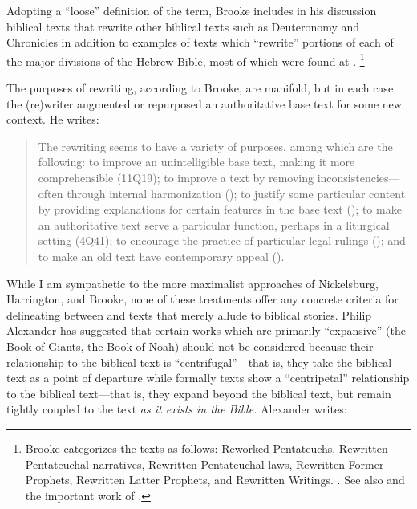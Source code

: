     \autocite[777]{brooke_schiffman-vanderkam2000}
Adopting a ``loose'' definition of the term, Brooke includes in his discussion biblical texts that rewrite other biblical texts such as Deuteronomy and Chronicles in addition to examples of texts which ``rewrite'' portions of each of the major divisions of the Hebrew Bible, most of which were found at \qumran.%
    \footnote{%
        Brooke categorizes the texts as follows: Reworked Pentateuchs, Rewritten Pentateuchal narratives, Rewritten Pentateuchal laws, Rewritten Former Prophets, Rewritten Latter Prophets, and Rewritten Writings.
        \cite[778--780]{brooke_schiffman-vanderkam2000}. See also 
        \cite{brooke_herbert-tov2002} and the important work of 
        \cite{falk2007}.}

The purposes of rewriting, according to Brooke, are manifold, but in each case the (re)writer augmented or repurposed an authoritative base text for some new context. He writes: 

\begin{quote}
    The rewriting seems to have a variety of purposes, among which are the following: to improve an unintelligible base text, making it more comprehensible (11Q19); to improve a text by removing inconsistencies---often through internal harmonization (); to justify some particular content by providing explanations for certain features in the base text (); to make an authoritative text serve a particular function, perhaps in a liturgical setting (4Q41); to encourage the practice of particular legal rulings (\jub); and to make an old text have contemporary appeal (\templescroll).%
    \autocite[778]{brooke_schiffman-vanderkam2000}
\end{quote} 
\noindent
While I am sympathetic to the more maximalist approaches of Nickelsburg, Harrington, and Brooke, none of these treatments offer any concrete criteria for delineating between \rwb and texts that merely allude to biblical stories. Philip Alexander has suggested that certain works which are primarily ``expansive'' (the Book of Giants, the Book of Noah) should not be considered \rwb because their relationship to the biblical text is ``centrifugal''---that is, they take the biblical text as a point of departure while formally \rwb texts show a ``centripetal'' relationship to the biblical text---that is, they expand beyond the biblical text, but remain tightly coupled to the text \emph{as it exists in the Bible.} Alexander writes: 

